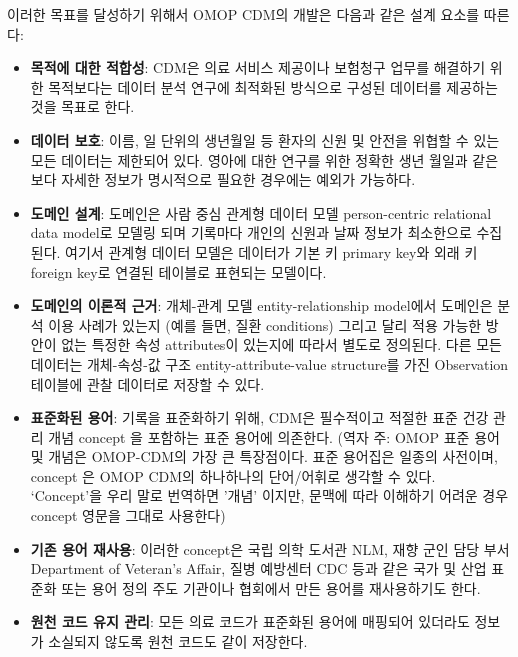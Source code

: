 \documentclass[10.5pt]{book}
\providecommand{\tightlist}{%
  \setlength{\itemsep}{0pt}\setlength{\parskip}{0pt}}
\theoremstyle{definition}
\theoremstyle{definition}
\theoremstyle{definition}
\theoremstyle{remark}
\begin{document}
이러한 목표를 달성하기 위해서 OMOP CDM의 개발은 다음과 같은 설계 요소를
따른다:

\begin{itemize}
\tightlist
\item
  \textbf{목적에 대한 적합성}: CDM은 의료 서비스 제공이나 보험청구
  업무를 해결하기 위한 목적보다는 데이터 분석 연구에 최적화된 방식으로
  구성된 데이터를 제공하는 것을 목표로
  한다.
\item
  \textbf{데이터 보호}: 이름, 일 단위의 생년월일 등 환자의 신원 및
  안전을 위협할 수 있는 모든 데이터는 제한되어 있다. 영아에 대한 연구를
  위한 정확한 생년 월일과 같은 보다 자세한 정보가 명시적으로 필요한
  경우에는 예외가 가능하다.
\item
  \textbf{도메인 설계}: 도메인은 사람 중심 관계형 데이터 모델
  person-centric relational data model로 모델링 되며 기록마다 개인의
  신원과 날짜 정보가 최소한으로 수집된다. 여기서 관계형 데이터 모델은
  데이터가 기본 키 primary key와 외래 키 foreign key로 연결된 테이블로
  표현되는 모델이다.
\item
  \textbf{도메인의 이론적 근거}: 개체-관계 모델 entity-relationship
  model에서 도메인은 분석 이용 사례가 있는지 (예를 들면, 질환
  conditions) 그리고 달리 적용 가능한 방안이 없는 특정한 속성
  attributes이 있는지에 따라서 별도로 정의된다. 다른 모든 데이터는
  개체-속성-값 구조 entity-attribute-value structure를 가진 Observation
  테이블에 관찰 데이터로 저장할 수
  있다.
\item
  \textbf{표준화된 용어}: 기록을 표준화하기 위해, CDM은 필수적이고
  적절한 표준 건강 관리 개념 concept 을 포함하는 표준 용어에 의존한다.
  (역자 주: OMOP 표준 용어 및 개념은 OMOP-CDM의 가장 큰 특장점이다. 표준
  용어집은 일종의 사전이며, concept 은 OMOP CDM의 하나하나의 단어/어휘로
  생각할 수 있다. `Concept'을 우리 말로 번역하면 '개념' 이지만, 문맥에
  따라 이해하기 어려운 경우 concept 영문을 그대로 사용한다)
\item
  \textbf{기존 용어 재사용}: 이러한 concept은 국립 의학 도서관 NLM, 재향
  군인 담당 부서 Department of Veteran's Affair, 질병 예방센터 CDC 등과
  같은 국가 및 산업 표준화 또는 용어 정의 주도 기관이나 협회에서 만든
  용어를 재사용하기도 한다.
\item
  \textbf{원천 코드 유지 관리}: 모든 의료 코드가 표준화된 용어에
  매핑되어 있더라도 정보가 소실되지 않도록 원천 코드도 같이
  저장한다.

\end{itemize}
\end{document}
